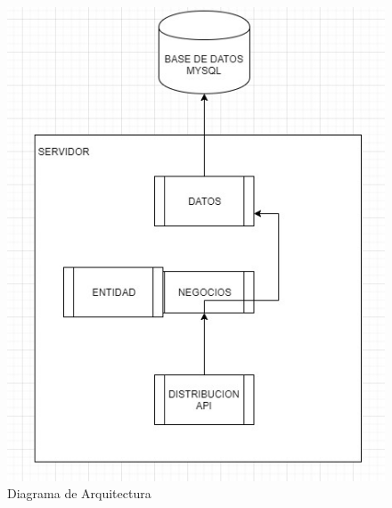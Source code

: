 \documentclass{article}
\begin{document}
\begin{figure}
    \centering
    \includegraphics{Diagrama.png}
    \caption{Diagrama de Arquitectura}
    \label{fig:my_label}
\end{figure}
\end{document}
